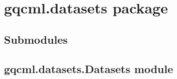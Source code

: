 \documentclass[letterpaper,10pt,english]{sphinxmanual}
\begin{document}
\chapter{gqcml.datasets package}
\label{\detokenize{modules/gqcml.datasets:gqcml-datasets-package}}\label{\detokenize{modules/gqcml.datasets::doc}}

\section{Submodules}
\label{\detokenize{modules/gqcml.datasets:submodules}}

\section{gqcml.datasets.Datasets module}
\label{\detokenize{modules/gqcml.datasets:module-gqcml.datasets.Datasets}}\label{\detokenize{modules/gqcml.datasets:gqcml-datasets-datasets-module}}
\end{document}

